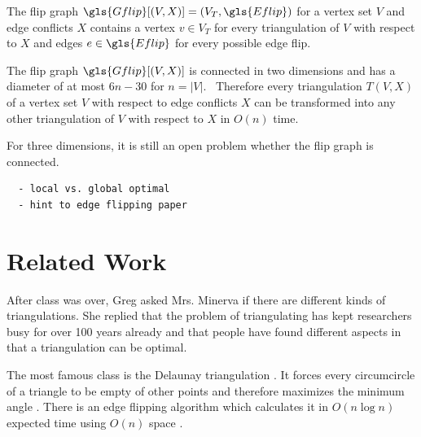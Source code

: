 
\begin{definition}
  \label{def:flip_graph}
  The flip graph \(\gls{Gflip}[(V,X)] = (V_T,\gls{Eflip})\) for a
  vertex set \(V\) and edge conflicts \(X\) contains a vertex
  \(v \in V_T\) for every triangulation of \(V\) with respect to
  \(X\) and edges \(e \in \gls{Eflip}\) for every possible edge flip.
\end{definition}


\begin{theorem}
  The flip graph \(\gls{Gflip}[(V,X)]\) is connected in two dimensions
  \cite[Behauptung 4]{flip_graph_connected} and has a diameter of
  at most \(6n - 30\) for \(n = |V|\).~\cite{flip_graph_diameter}
  Therefore every triangulation \(T(V,X)\) of a vertex set \(V\)
  with respect to edge conflicts \(X\) can be transformed into any
  other triangulation of \(V\) with respect to \(X\) in \(O(n)\)
  time.
  
  For three dimensions, it is still an open problem whether
  the flip graph is connected.~\cite{flip_graph_3d}
\end{theorem}

\begin{verbatim}
  - local vs. global optimal
  - hint to edge flipping paper
\end{verbatim}


\section{Related Work}
After class was over, Greg asked Mrs. Minerva if there are different
kinds of triangulations. She replied that the problem of 
triangulating has kept researchers busy for over 100 years already
\cite{triangulation_hilbert} and that people have found different
aspects in that a triangulation can be optimal.

The most famous class is the Delaunay triangulation
\cite[Section 9.2]{deberg_compgeom}. It forces every circumcircle
of a triangle to be empty of other points and therefore maximizes
the minimum angle \cite[Theorem 9.9]{deberg_compgeom}. There is an
edge flipping algorithm which calculates it in \(O(n \log n)\) 
expected time using \(O(n)\) space 
\cite[Theorem 9.12]{deberg_compgeom}.

